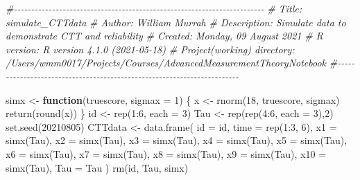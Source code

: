 \documentclass[
]{book}
\newenvironment{Shaded}{\begin{snugshade}}{\end{snugshade}}
\newcommand{\AttributeTok}[1]{\textcolor[rgb]{0.77,0.63,0.00}{#1}}
\newcommand{\CommentTok}[1]{\textcolor[rgb]{0.56,0.35,0.01}{\textit{#1}}}
\newcommand{\ControlFlowTok}[1]{\textcolor[rgb]{0.13,0.29,0.53}{\textbf{#1}}}
\newcommand{\DecValTok}[1]{\textcolor[rgb]{0.00,0.00,0.81}{#1}}
\newcommand{\FunctionTok}[1]{\textcolor[rgb]{0.00,0.00,0.00}{#1}}
\newcommand{\NormalTok}[1]{#1}
\newcommand{\OtherTok}[1]{\textcolor[rgb]{0.56,0.35,0.01}{#1}}
\newcommand{\SpecialCharTok}[1]{\textcolor[rgb]{0.00,0.00,0.00}{#1}}
\begin{document}
\begin{Shaded}
\begin{Highlighting}[]
\CommentTok{\#{-}{-}{-}{-}{-}{-}{-}{-}{-}{-}{-}{-}{-}{-}{-}{-}{-}{-}{-}{-}{-}{-}{-}{-}{-}{-}{-}{-}{-}{-}{-}{-}{-}{-}{-}{-}{-}{-}{-}{-}{-}{-}{-}{-}{-}{-}{-}{-}{-}{-}{-}{-}{-}{-}{-}{-}{-}{-}{-}{-}{-}{-}{-}{-}{-}{-}{-}{-}{-}{-}{-}{-}}
\CommentTok{\# Title: simulate\_CTTdata}
\CommentTok{\# Author: William Murrah}
\CommentTok{\# Description: Simulate data to demonstrate CTT and reliability}
\CommentTok{\# Created: Monday, 09 August 2021}
\CommentTok{\# R version: R version 4.1.0 (2021{-}05{-}18)}
\CommentTok{\# Project(working) directory: /Users/wmm0017/Projects/Courses/AdvancedMeasurementTheoryNotebook}
\CommentTok{\#{-}{-}{-}{-}{-}{-}{-}{-}{-}{-}{-}{-}{-}{-}{-}{-}{-}{-}{-}{-}{-}{-}{-}{-}{-}{-}{-}{-}{-}{-}{-}{-}{-}{-}{-}{-}{-}{-}{-}{-}{-}{-}{-}{-}{-}{-}{-}{-}{-}{-}{-}{-}{-}{-}{-}{-}{-}{-}{-}{-}{-}{-}{-}{-}{-}{-}{-}{-}{-}{-}{-}{-}}

\NormalTok{simx }\OtherTok{\textless{}{-}} \ControlFlowTok{function}\NormalTok{(truescore, }\AttributeTok{sigmax =} \DecValTok{1}\NormalTok{) \{}
\NormalTok{  x }\OtherTok{\textless{}{-}} \FunctionTok{rnorm}\NormalTok{(}\DecValTok{18}\NormalTok{, truescore, sigmax)}
  \FunctionTok{return}\NormalTok{(}\FunctionTok{round}\NormalTok{(x))}
\NormalTok{\}}
\NormalTok{id }\OtherTok{\textless{}{-}} \FunctionTok{rep}\NormalTok{(}\DecValTok{1}\SpecialCharTok{:}\DecValTok{6}\NormalTok{, }\AttributeTok{each =} \DecValTok{3}\NormalTok{)}
\NormalTok{Tau }\OtherTok{\textless{}{-}} \FunctionTok{rep}\NormalTok{(}\FunctionTok{rep}\NormalTok{(}\DecValTok{4}\SpecialCharTok{:}\DecValTok{6}\NormalTok{, }\AttributeTok{each =} \DecValTok{3}\NormalTok{),}\DecValTok{2}\NormalTok{)}
\FunctionTok{set.seed}\NormalTok{(}\DecValTok{20210805}\NormalTok{)}
\NormalTok{CTTdata }\OtherTok{\textless{}{-}} \FunctionTok{data.frame}\NormalTok{(}
  \AttributeTok{id =}\NormalTok{ id,}
  \AttributeTok{time =} \FunctionTok{rep}\NormalTok{(}\DecValTok{1}\SpecialCharTok{:}\DecValTok{3}\NormalTok{, }\DecValTok{6}\NormalTok{),}
  \AttributeTok{x1 =} \FunctionTok{simx}\NormalTok{(Tau),}
  \AttributeTok{x2 =} \FunctionTok{simx}\NormalTok{(Tau),}
  \AttributeTok{x3 =} \FunctionTok{simx}\NormalTok{(Tau),}
  \AttributeTok{x4 =} \FunctionTok{simx}\NormalTok{(Tau),}
  \AttributeTok{x5 =} \FunctionTok{simx}\NormalTok{(Tau),}
  \AttributeTok{x6 =} \FunctionTok{simx}\NormalTok{(Tau),}
  \AttributeTok{x7 =} \FunctionTok{simx}\NormalTok{(Tau),}
  \AttributeTok{x8 =} \FunctionTok{simx}\NormalTok{(Tau),}
  \AttributeTok{x9 =} \FunctionTok{simx}\NormalTok{(Tau),}
  \AttributeTok{x10 =} \FunctionTok{simx}\NormalTok{(Tau),}
  \AttributeTok{Tau =}\NormalTok{ Tau}
\NormalTok{)}
\FunctionTok{rm}\NormalTok{(id, Tau, simx)}
\end{Highlighting}
\end{Shaded}
\end{document}
